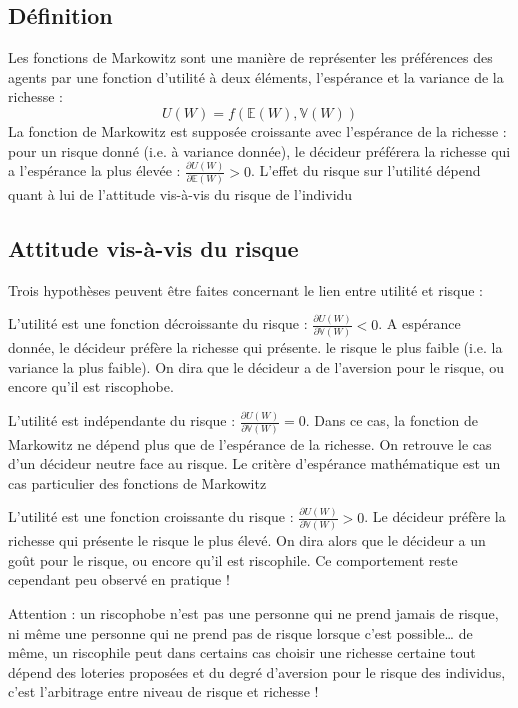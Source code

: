 \documentclass[a4paper, 12pt]{report}
\begin{document}
\subsection{Définition}

Les fonctions de Markowitz sont une manière de représenter les préférences des agents par une fonction d'utilité à deux éléments, l'espérance et la variance de la richesse :
$$
U(W)=f\left(\mathbb{E}(W),\mathbb{V}(W)\right)
$$
La fonction de Markowitz est supposée croissante avec l'espérance de la richesse : pour un risque donné (i.e. à variance donnée), le décideur préférera la richesse qui a l'espérance la plus élevée : $\frac{\partial U(W)}{\partial \mathbb{E}(W)}>0$. L'effet du risque sur l'utilité dépend quant à lui de l'attitude vis-à-vis du risque de l'individu

\subsection{Attitude vis-à-vis du risque}

Trois hypothèses peuvent être faites concernant le lien entre utilité et risque :

L'utilité est une fonction décroissante du risque : $\frac{\partial U(W)}{\partial \mathbb{V}(W)}<0$. A espérance donnée, le décideur préfère la richesse qui présente. le risque le plus faible (i.e. la variance la plus faible). On dira que le décideur a de l'aversion pour le risque, ou encore
qu'il est riscophobe. 

L'utilité est indépendante du risque : $\frac{\partial U(W)}{\partial \mathbb{V}(W)}=0$. Dans ce cas, la fonction de Markowitz ne dépend plus que de
l'espérance de la richesse. On retrouve le cas d'un décideur neutre face au risque. Le critère d'espérance mathématique est un cas particulier des
fonctions de Markowitz

L'utilité est une fonction croissante du risque :  $\frac{\partial U(W)}{\partial \mathbb{V}(W)}>0$. Le décideur préfère la richesse qui présente le risque le plus élevé. On dira alors que le décideur a un goût pour le risque, ou encore qu'il est riscophile. Ce comportement reste cependant peu observé en pratique !

Attention : un riscophobe n'est pas une personne qui ne prend jamais de risque, ni même une personne qui ne prend pas de risque lorsque c'est possible… de même, un riscophile peut dans certains cas choisir une richesse certaine tout dépend des loteries proposées et du degré d'aversion pour le risque des individus, c'est l'arbitrage entre niveau de risque et richesse !
\end{document}
